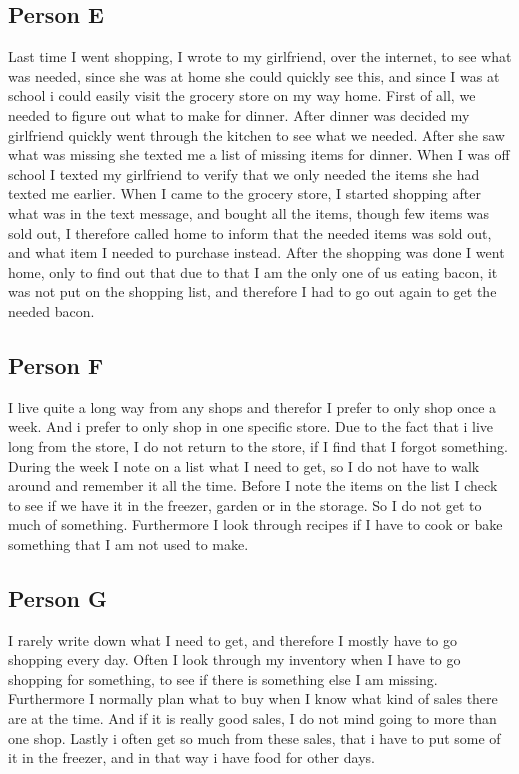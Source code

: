 \subsection{Person E}
Last time I went shopping, I wrote to my girlfriend, over the internet, to see what was needed, since she was at home she could quickly see this, and since I was at school i could easily  visit the grocery store on my way home. First of all, we needed to figure out what to make for dinner. After dinner was decided my girlfriend quickly went through the kitchen to see what we needed. After she saw what was missing she texted me a list of missing items for dinner. When I was off school I texted my girlfriend to verify that we only needed the items she had texted me earlier. When I came to the grocery store, I started shopping after what was in the text message, and bought all the items, though few items was sold out, I  therefore called home to inform that the needed items was sold out, and what item I needed to purchase instead. After the shopping was done I went home, only to find out that due to that I am the only one of us eating bacon, it was not put on the shopping list, and therefore I had to go out again to get the needed bacon.

\subsection{Person F}
I live quite a long way from any shops and therefor I prefer to only shop once a week. And i prefer to only shop in one specific store. Due to the fact that i live long from the store, I do not return to the store, if I find that I forgot something. During the week I note on a list what I need to get, so I do not have to walk around and remember it all the time. Before I note the items on the list I check to see if we have it in the freezer, garden or in the storage. So I do not get to much of something. Furthermore I look through recipes if I have to cook or bake something that I am not used to make.

\subsection{Person G}
I rarely write down what I need to get, and therefore I mostly have to go shopping every day. Often I look through my inventory when I have to go shopping for something, to see if there is something else I am missing. Furthermore I normally plan what to buy when I know what kind of sales there are at the time. And if it is really good sales, I do not mind going to more than one shop. Lastly i often get so much from these sales, that i have to put some of it in the freezer, and in that way i have food for other days.